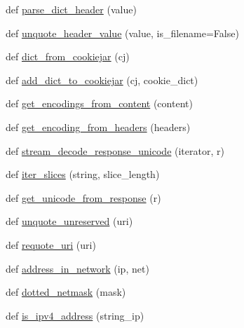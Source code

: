 \begin{DoxyCompactItemize}
\item 
def \hyperlink{namespacepip_1_1__vendor_1_1requests_1_1utils_aa842aa43c5306b1871a2a522b1a4e43e}{parse\+\_\+dict\+\_\+header} (value)
\item 
def \hyperlink{namespacepip_1_1__vendor_1_1requests_1_1utils_ad066c2e49fc6bb25482c1a6ae0ef2f46}{unquote\+\_\+header\+\_\+value} (value, is\+\_\+filename=False)
\item 
def \hyperlink{namespacepip_1_1__vendor_1_1requests_1_1utils_af3f34d45bda7d6efb8b5a29d114d37d2}{dict\+\_\+from\+\_\+cookiejar} (cj)
\item 
def \hyperlink{namespacepip_1_1__vendor_1_1requests_1_1utils_a143c04ce30975c09b175088019035604}{add\+\_\+dict\+\_\+to\+\_\+cookiejar} (cj, cookie\+\_\+dict)
\item 
def \hyperlink{namespacepip_1_1__vendor_1_1requests_1_1utils_a8902c8d343b5f463eae5d6e9c62bd906}{get\+\_\+encodings\+\_\+from\+\_\+content} (content)
\item 
def \hyperlink{namespacepip_1_1__vendor_1_1requests_1_1utils_af1d04efb1686360ff22356a9ff956bcf}{get\+\_\+encoding\+\_\+from\+\_\+headers} (headers)
\item 
def \hyperlink{namespacepip_1_1__vendor_1_1requests_1_1utils_ab84697ffe4a07ee67e2664801a3b52c3}{stream\+\_\+decode\+\_\+response\+\_\+unicode} (iterator, r)
\item 
def \hyperlink{namespacepip_1_1__vendor_1_1requests_1_1utils_ae22cd43e29bae215457876aae0b77681}{iter\+\_\+slices} (string, slice\+\_\+length)
\item 
def \hyperlink{namespacepip_1_1__vendor_1_1requests_1_1utils_ae0ae60e469f026dce18fcbb979c9d806}{get\+\_\+unicode\+\_\+from\+\_\+response} (r)
\item 
def \hyperlink{namespacepip_1_1__vendor_1_1requests_1_1utils_a8122451970263132fdcca678a68848f4}{unquote\+\_\+unreserved} (uri)
\item 
def \hyperlink{namespacepip_1_1__vendor_1_1requests_1_1utils_a7fd50a6b57eb0d403b74b7faec2e6dc5}{requote\+\_\+uri} (uri)
\item 
def \hyperlink{namespacepip_1_1__vendor_1_1requests_1_1utils_a05aa952db08308e80331c871b62a7046}{address\+\_\+in\+\_\+network} (ip, net)
\item 
def \hyperlink{namespacepip_1_1__vendor_1_1requests_1_1utils_aff7793b7408df70069a1ff48cc665816}{dotted\+\_\+netmask} (mask)
\item 
def \hyperlink{namespacepip_1_1__vendor_1_1requests_1_1utils_ae7625986a330e66a5a237c2789b55390}{is\+\_\+ipv4\+\_\+address} (string\+\_\+ip)

\end{DoxyCompactItemize}
